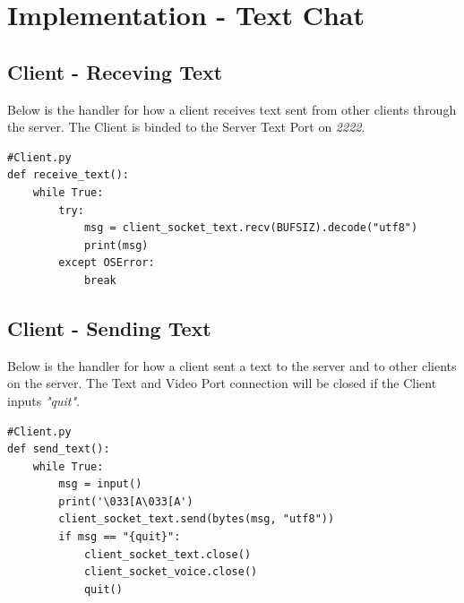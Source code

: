 \documentclass[a4paper,11pt]{article}
\begin{document}
\section{Implementation - Text Chat}

\subsection{Client - Receving Text }
Below is the handler for how a client receives text sent from other clients through the server. The Client is binded to the Server Text Port on \textit{2222}.
\begin{mdframed}[backgroundcolor=light-gray, roundcorner=30pt,leftmargin=1, rightmargin=1, innerleftmargin=5, innertopmargin=-3,innerbottommargin=5, outerlinewidth=1, linecolor=light-gray]
\begin{lstlisting}
#Client.py
def receive_text():
	while True:
		try:
			msg = client_socket_text.recv(BUFSIZ).decode("utf8")
			print(msg)
		except OSError:
			break
\end{lstlisting}
\end{mdframed}

\subsection{Client - Sending Text}
Below is the handler for how a client sent a text to the server and to other clients on the server. The Text and Video Port connection will be closed if the Client inputs \textit{"quit"}.
\begin{mdframed}[backgroundcolor=light-gray, roundcorner=30pt,leftmargin=1, rightmargin=1, innerleftmargin=5, innertopmargin=-3,innerbottommargin=5, outerlinewidth=1, linecolor=light-gray]
\begin{lstlisting}
#Client.py
def send_text():
	while True:
		msg = input()
		print('\033[A\033[A')
		client_socket_text.send(bytes(msg, "utf8"))
		if msg == "{quit}":
			client_socket_text.close()
			client_socket_voice.close()
			quit()
\end{lstlisting}
\end{mdframed}
\end{document}
